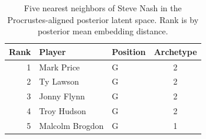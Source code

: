 \begin{table}[htbp]
  \centering\small
  \begin{tabular}{rllc}
    \toprule
    Rank & Player & Position & Archetype \\
    \midrule
    1 & Mark Price & G & 2 \\
    2 & Ty Lawson & G & 2 \\
    3 & Jonny Flynn & G & 2 \\
    4 & Troy Hudson & G & 2 \\
    5 & Malcolm Brogdon & G & 1 \\
    \bottomrule
  \end{tabular}
  \caption{Five nearest neighbors of Steve Nash in the Procrustes-aligned posterior latent space. Rank is by posterior mean embedding distance.}
  \label{tab:Steve_Nash_neighbors}
\end{table}

